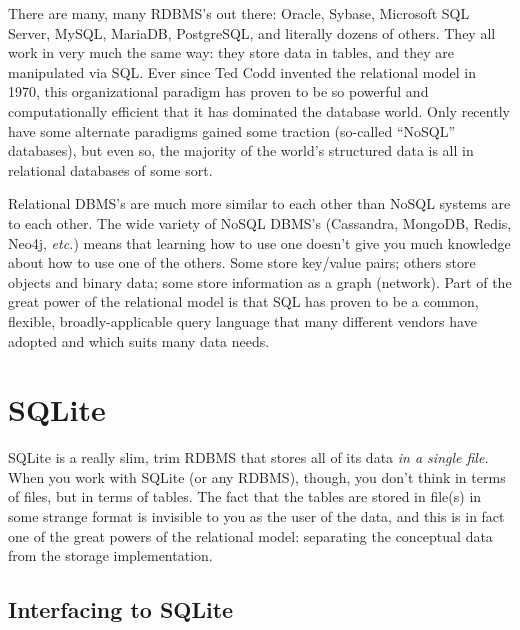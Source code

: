 
There are many, many RDBMS's out there: Oracle, Sybase, Microsoft SQL Server,
MySQL, MariaDB, PostgreSQL, and literally dozens of others. They all work in
very much the same way: they store data in tables, and they are manipulated via
SQL. Ever since Ted Codd invented the relational model in 1970, this
organizational paradigm has proven to be so powerful and computationally
efficient that it has dominated the database world. Only recently have some
alternate paradigms gained some traction (so-called ``NoSQL'' databases), but
even so, the majority of the world's structured data is all in relational
databases of some sort.


Relational DBMS's are much more similar to each other than NoSQL systems are to
each other. The wide variety of NoSQL DBMS's (Cassandra, MongoDB, Redis, Neo4j,
\textit{etc.}) means that learning how to use one doesn't give you much
knowledge about how to use one of the others. Some store key/value pairs;
others store objects and binary data; some store information as a graph
(network). Part of the great power of the relational model is that SQL has
proven to be a common, flexible, broadly-applicable query language that many
different vendors have adopted and which suits many data needs.

\section{SQLite}


SQLite is a really slim, trim RDBMS that stores all of its data \textit{in a
single file.} When you work with SQLite (or any RDBMS), though, you don't think
in terms of files, but in terms of tables. The fact that the tables are stored
in file(s) in some strange format is invisible to you as the user of the data,
and this is in fact one of the great powers of the relational model: separating
the conceptual data from the storage implementation.

\subsection{Interfacing to SQLite}

